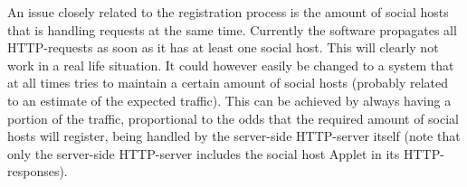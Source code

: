 \documentclass[a4paper, 10pt]{article}
\begin{document}
An issue closely related to the registration process is the amount of social hosts that is handling requests at the same time. Currently the software propagates all HTTP-requests as soon as it has at least one social host. This will clearly not work in a real life situation. It could however easily be changed to a system that at all times tries to maintain a certain amount of social hosts (probably related to an estimate of the expected traffic). This can be achieved by always having a portion of the traffic, proportional to the odds that the required amount of social hosts will register, being handled by the server-side HTTP-server itself (note that only the server-side HTTP-server includes the social host Applet in its HTTP-responses).
\end{document}
